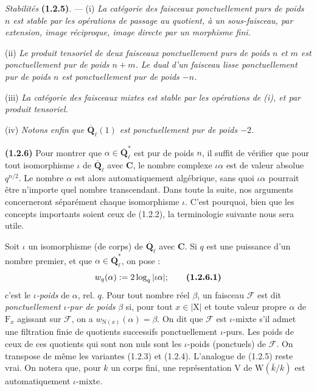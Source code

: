 \documentclass[11pt,leqno]{article}
\begin{document}
\textit{Stabilités} \textbf{(1.2.5)}. — (i) \textit{La catégorie des faisceaux ponctuellement purs de poids \(n\) est stable par les opérations de passage au quotient, à un sous-faisceau, par extension, image réciproque, image directe par un morphisme fini.}

(ii) \textit{Le produit tensoriel de deux faisceaux ponctuellement purs de poids \(n\) et \(m\) est ponctuellement pur de poids \(n+m\). Le dual d’un faisceau lisse ponctuellement pur de poids \(n\) est ponctuellement pur de poids \(-n\).}

(iii) \textit{La catégorie des faisceaux mixtes est stable par les opérations de \textup{(i)}, et par produit tensoriel.}

(iv) \textit{Notons enfin que \(\overline{\mathbf{Q}}_\ell(1)\) est ponctuellement pur de poids \(-2\).}

\textbf{(1.2.6)} Pour montrer que \(\alpha\in\overline{\mathbf{Q}}_\ell^*\) est pur de poids \(n\), il suffit de vérifier que pour tout isomorphisme \(\iota\) de \(\overline{\mathbf{Q}}_\ell\) avec \(\mathbf{C}\), le nombre complexe \(\iota\alpha\) est de valeur absolue \(q^{n/2}\). Le nombre \(\alpha\) est alors automatiquement algébrique, sans quoi \(\iota\alpha\) pourrait être n’importe quel nombre transcendant. Dans toute la suite, nos arguments concerneront séparément chaque isomorphisme \(\iota\). C’est pourquoi, bien que les concepts importants soient ceux de (1.2.2), la terminologie suivante nous sera utile.

Soit \(\iota\) un isomorphisme (de corps) de \(\overline{\mathbf{Q}}_\ell\) avec \(\mathbf{C}\). Si \(q\) est une puissance d’un nombre premier, et que \(\alpha\in\overline{\mathbf{Q}}_\ell^*\), on pose :
\[
w_q(\alpha):=2\log_q|\iota\alpha|;
\tag*{\textbf{(1.2.6.1)}}
\]
c’est le \textit{\(\iota\)-poids} de \(\alpha\), rel. \(q\). Pour tout nombre réel \(\beta\), un faisceau \(\mathscr{F}\) est dit \textit{ponctuellement \(\iota\)-pur de poids} \(\beta\) si, pour tout \(x\in|\mathrm{X}|\) et toute valeur propre \(\alpha\) de \(\mathrm{F}_x\) agissant sur \(\mathscr{F}\), on a \(w_{\mathrm{N}(x)}(\alpha)=\beta\). On dit que \(\mathscr{F}\) est \(\iota\)-mixte s’il admet une filtration finie de quotients successifs ponctuellement \(\iota\)-purs. Les poids de ceux de ces quotients qui sont non nuls sont les \(\iota\)-poids (ponctuels) de \(\mathscr{F}\). On transpose de même les variantes (1.2.3) et (1.2.4). L’analogue de (1.2.5) reste vrai. On notera que, pour \(k\) un corps fini, une représentation \(\mathrm{V}\) de \(\mathrm{W}(\bar{k}/k)\) est automatiquement \(\iota\)-mixte.
\end{document}
